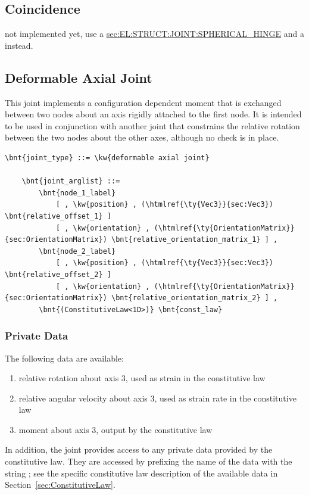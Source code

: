 \subsection{Coincidence}
not implemented yet, use a
\hyperref{\kw{spherical hinge}}{\kw{spherical hinge} (see Section~}{)}{sec:EL:STRUCT:JOINT:SPHERICAL_HINGE}
and a  
instead.




\subsection{Deformable Axial Joint}
\label{sec:EL:JOINT:DEFORMABLEAXIAL}
This joint implements a configuration dependent moment that is exchanged
between two nodes about an axis rigidly attached to the first node.
It is intended to be used in conjunction with another joint that
constrains the relative rotation between the two nodes about the other axes,
although no check is in place.
\begin{Verbatim}[commandchars=\\\{\}]
    \bnt{joint_type} ::= \kw{deformable axial joint}

    \bnt{joint_arglist} ::= 
        \bnt{node_1_label}
            [ , \kw{position} , (\htmlref{\ty{Vec3}}{sec:Vec3}) \bnt{relative_offset_1} ]
            [ , \kw{orientation} , (\htmlref{\ty{OrientationMatrix}}{sec:OrientationMatrix}) \bnt{relative_orientation_matrix_1} ] ,
        \bnt{node_2_label}
            [ , \kw{position} , (\htmlref{\ty{Vec3}}{sec:Vec3}) \bnt{relative_offset_2} ]
            [ , \kw{orientation} , (\htmlref{\ty{OrientationMatrix}}{sec:OrientationMatrix}) \bnt{relative_orientation_matrix_2} ] ,
        \bnt{(ConstitutiveLaw<1D>)} \bnt{const_law}
\end{Verbatim}

\subsubsection{Private Data}
The following data are available:
\begin{enumerate}
\item {} relative rotation about axis 3, used as strain in the constitutive law
\item {} relative angular velocity about axis 3, used as strain rate in the constitutive law
\item {} moment about axis 3, output by the constitutive law
\end{enumerate}
In addition, the joint provides
access to any private data provided by the constitutive law.
They are accessed by prefixing the name of the data with the string
; see the specific constitutive law
description of the available data in Section~\ref{sec:ConstitutiveLaw}.


